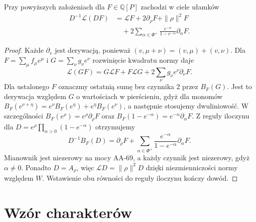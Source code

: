 \begin{lemat}
\label{aa:lem:weyl-differential-product}
Przy powyższych założeniach dla $F\in\mathbb Q[P]$ zachodzi w ciele ułamków
\[
 \begin{aligned}
 D^{-1}\mathcal L(DF)
 &=\mathcal LF+2\partial_\rho F+\|\rho\|^2 F\\
 &\quad+2\sum_{\alpha\in\Phi^+}
     \frac{e^{-\alpha}}{1-e^{-\alpha}}\partial_\alpha F.
 \end{aligned}
\]
\end{lemat}
\begin{proof}
Każde $\partial_v$ jest derywacją, ponieważ $(v,\mu+\nu)=(v,\mu)+(v,\nu)$. Dla $F=\sum_\mu f_\mu e^\mu$ i $G=\sum_\nu g_\nu e^\nu$ rozwinięcie kwadratu normy daje
\[
 \mathcal L(GF)=G\mathcal LF+F\mathcal LG+
 2\sum_{\nu}g_\nu e^\nu\partial_\nu F.
\]
Dla ustalonego $F$ oznaczmy ostatnią sumę bez czynnika $2$ przez $B_F(G)$. Jest to derywacja względem $G$ o wartościach w pierścieniu, gdyż dla monomów $B_F(e^{\nu+\eta})=e^\nu B_F(e^\eta)+e^\eta B_F(e^\nu)$, a następnie stosujemy dwuliniowość. W szczególności $B_F(e^\rho)=e^\rho\partial_\rho F$ oraz $B_F(1-e^{-\alpha})=e^{-\alpha}\partial_\alpha F$. Z reguły iloczynu dla $D=e^\rho\prod_{\alpha>0}(1-e^{-\alpha})$ otrzymujemy
\[
 D^{-1}B_F(D)=\partial_\rho F+
     \sum_{\alpha\in\Phi^+}\frac{e^{-\alpha}}{1-e^{-\alpha}}\partial_\alpha F.
\]
Mianownik jest niezerowy na mocy AA-69, a każdy czynnik jest niezerowy, gdyż $\alpha\ne0$. Ponadto $D=A_\rho$, więc $\mathcal LD=\|\rho\|^2D$ dzięki niezmienniczości normy względem $W$. Wstawienie obu równości do reguły iloczynu kończy dowód.
\end{proof}

\section{Wzór charakterów}

